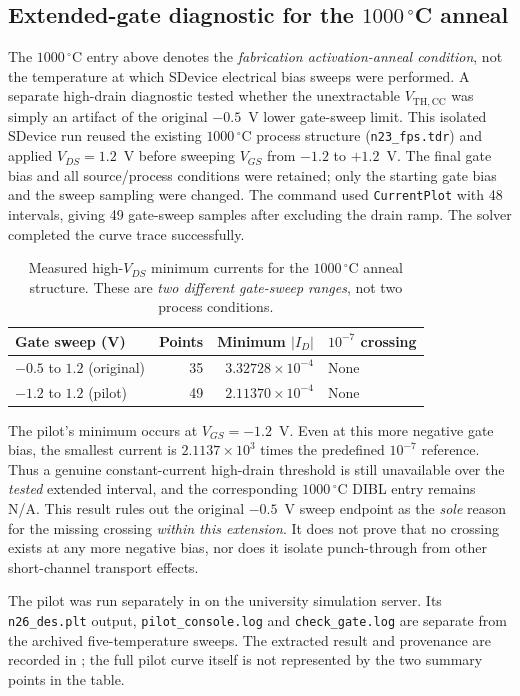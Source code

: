 \subsection[Extended-gate diagnostic at 1000 C]{Extended-gate diagnostic for the $1000\,^\circ$C anneal}
The $1000\,^\circ$C entry above denotes the \emph{fabrication
activation-anneal condition}, not the temperature at which
SDevice electrical bias sweeps were performed. A separate
high-drain diagnostic tested whether the unextractable
$V_{\mathrm{TH,CC}}$ was simply an artifact of the original
$-0.5$~V lower gate-sweep limit. This isolated SDevice run
reused the existing $1000\,^\circ$C process structure
(\texttt{n23\_fps.tdr}) and applied $V_{DS}=1.2$~V before
sweeping $V_{GS}$ from $-1.2$ to $+1.2$~V. The final gate
bias and all source/process conditions were retained; only
the starting gate bias and the sweep sampling were changed.
The command used \texttt{CurrentPlot} with 48 intervals,
giving 49 gate-sweep samples after excluding the drain ramp.
The solver completed the curve trace successfully.

\begin{table}[H]\centering\small
\caption{Measured high-$V_{DS}$ minimum currents for the
$1000\,^\circ$C anneal structure. These are \emph{two
different gate-sweep ranges}, not two process conditions.}
\begin{tabular}{@{}lrrl@{}}\toprule
Gate sweep (V) & Points & Minimum $|I_D|$ &
$10^{-7}$ crossing\\\midrule
$-0.5$ to $1.2$ (original) & 35 &
$3.32728\times10^{-4}$ & None\\
$-1.2$ to $1.2$ (pilot) & 49 &
$2.11370\times10^{-4}$ & None\\
\bottomrule\end{tabular}
\end{table}
The pilot's minimum occurs at $V_{GS}=-1.2$~V.
Even at this more negative gate bias, the smallest current
is $2.1137\times10^{3}$ times the predefined
$10^{-7}$ reference. Thus a genuine constant-current
high-drain threshold is still unavailable over the
\emph{tested} extended interval, and the corresponding
$1000\,^\circ$C DIBL entry remains N/A. This result rules
out the original $-0.5$~V sweep endpoint as the \emph{sole}
reason for the missing crossing \emph{within this extension}.
It does not prove that no crossing exists at any more
negative bias, nor does it isolate punch-through from other
short-channel transport effects.

The pilot was run separately in
 on the university
simulation server. Its \texttt{n26\_des.plt} output,
\texttt{pilot\_console.log} and
\texttt{check\_gate.log} are separate from the archived
five-temperature sweeps. The extracted result and provenance
are recorded in
;
the full pilot curve itself is not represented by the
two summary points in the table.


